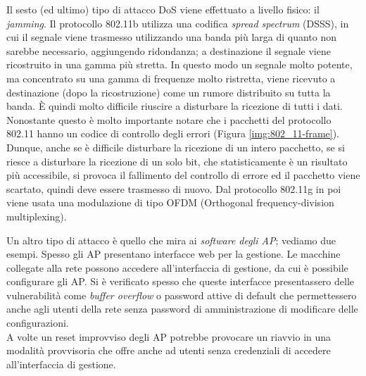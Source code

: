 Il sesto (ed ultimo) tipo di attacco DoS viene effettuato a livello fisico: il \textit{jamming}. Il protocollo 802.11b utilizza una codifica \textit{spread spectrum} (DSSS), in cui il segnale viene trasmesso utilizzando una banda più larga di quanto non sarebbe necessario, aggiungendo ridondanza; a destinazione il segnale viene ricostruito in una gamma più stretta. In questo modo un segnale molto potente, ma concentrato su una gamma di frequenze molto ristretta, viene ricevuto a destinazione (dopo la ricostruzione) come un rumore distribuito su tutta la banda. È quindi molto difficile riuscire a disturbare la ricezione di tutti i dati. Nonostante questo è molto importante notare che i pacchetti del protocollo 802.11 hanno un codice di controllo degli errori (Figura \ref{img:802_11-frame}). Dunque, anche se è difficile disturbare la ricezione di un intero pacchetto, se si riesce a disturbare la ricezione di un solo bit, che statisticamente è un risultato più accessibile, si provoca il fallimento del controllo di errore ed il pacchetto viene scartato, quindi deve essere trasmesso di nuovo. Dal protocollo 802.11g in poi viene usata una modulazione di tipo OFDM (Orthogonal frequency-division multiplexing).

Un altro tipo di attacco è quello che mira ai \textit{software degli AP}; vediamo due esempi. Spesso gli AP presentano interfacce web per la gestione. Le macchine collegate alla rete possono accedere all'interfaccia di gestione, da cui è possibile configurare gli AP. Si è verificato spesso che queste interfacce presentassero delle vulnerabilità come \textit{buffer overflow} o password attive di default che permettessero anche agli utenti della rete senza password di amministrazione di modificare delle configurazioni. \\
A volte un reset improvviso degli AP potrebbe provocare un riavvio in una modalità provvisoria che offre anche ad utenti senza credenziali di accedere all'interfaccia di gestione.\\

